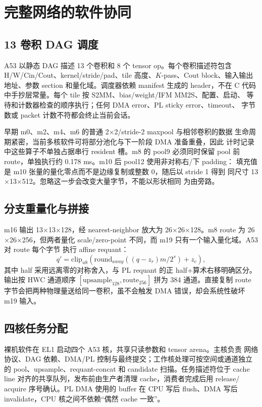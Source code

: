 \section{完整网络的软件协同}
\label{sec:software}

\subsection{13 卷积 DAG 调度}

A53 以静态 DAG 描述 13 个卷积和 8 个 tensor op。每个卷积描述符包含
H/W/Cin/Cout、kernel/stride/pad、tile 高度、$K$-pass、Cout block、输入输出
地址、参数 section 和量化域。调度器依赖 manifest 生成的 header，不在 C
代码中手抄层常量。每个 tile 按 S2MM、bias/weight/IFM MM2S、配置、启动、
等待和计数器检查的顺序执行；任何 DMA error、PL sticky error、timeout、
字节数或 packet 计数不符都会终止当前会话。

早期 m0、m2、m4、m6 的普通 2$\times$2/stride-2 maxpool 与相邻卷积的数据
生命周期紧密，当前多核软件可将部分池化与下一阶段 DMA 准备重叠，因此
计时记录中这些算子不单独占据串行 resident 槽。m8 的 pool9 必须同时保留
pool 前 route，单独执行约 0.178 ms。m10 后 pool12 使用非对称右/下 padding：
填充值是 m10 张量的量化零点而不是边缘复制或整数 0，随后以 stride 1 得到
同尺寸 13$\times$13$\times$512。忽略这一步会改变大量字节，不能以形状相同
为由旁路。

\subsection{分支重量化与拼接}

m16 输出 13$\times$13$\times$128，经 nearest-neighbor 放大为
26$\times$26$\times$128。m8 route 为 26$\times$26$\times$256，但两者量化
scale/zero-point 不同，而 m19 只有一个输入量化域。A53 对 route 每个字节
执行 affine requant：
\begin{equation}
q'=\mathrm{clip}_{u8}\left(\mathrm{round}_{away}
((q-z_r)m/2^s)+z_c\right),
\end{equation}
其中 half 采用远离零的对称舍入，与 PL requant 的正 half+算术右移明确区分。
输出按 HWC 通道顺序 $[\mathrm{upsample}_{128},\mathrm{route}_{256}]$ 拼为
384 通道。直接复制 route 字节会把两种物理量送给同一卷积，虽不会触发 DMA
错误，却会系统性破坏 m19 输入。

\subsection{四核任务分配}

裸机软件在 EL1 启动四个 A53 核，共享只读参数和 tensor arena。主核负责
网络协议、DAG 依赖、DMA/PL 控制与最终提交；工作核处理可按空间或通道独立
的 pool、upsample、requant-concat 和 candidate 扫描。任务描述符位于 cache
line 对齐的共享队列，发布前由生产者清理 cache，消费者完成后用 release/
acquire 序号确认。PL DMA 使用的 buffer 在 CPU 写后 flush、DMA 写后
invalidate，CPU 核之间不依赖“偶然 cache 一致”。

